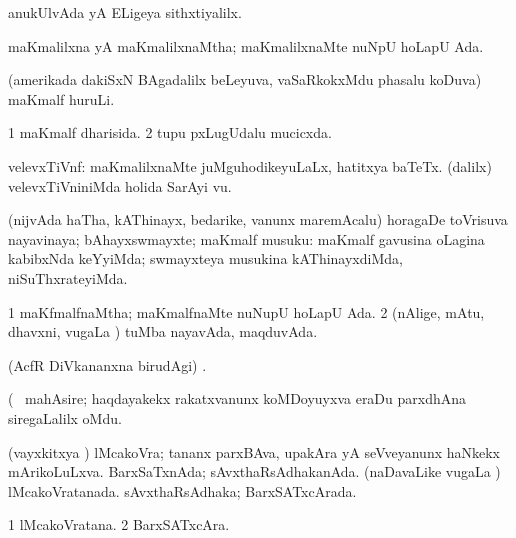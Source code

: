 \noindent 
\gl{\pagu}
\expl{}
\bmng
  anukUlvAda yA ELigeya sithxtiyalilx. 
\emng
\eentry

\bentry
{} 
\gl{\gu}
\expl{}
\bmng
 maKmalilxna yA maKmalilxnaMtha; maKmalilxnaMte nuNpU hoLapU Ada. 
\emng
\eentry

\bentry
{}
\gl{\nA}
\expl{}
\bmng
 (amerikada dakiSxN BAgadalilx beLeyuva, vaSaRkokxMdu phasalu koDuva) maKmalf huruLi. 
\emng
\eentry

\bentry
{} 
\gl{\gu}
\expl{}
\bmng
\bnum
\num{1} maKmalf dharisida. 
\num{2} tupu pxLugUdalu mucicxda. 
\enum
\emng
\eentry

\bentry
{} 
\gl{\nA}
\expl{}
\bmng
 velevxTiVnf: 
\banum
{} maKmalilxnaMte juMguhodikeyuLaLx, hatitxya baTeTx. 
 (\bava dalilx) velevxTiVniniMda holida SarAyi \mo vu. 
\eanum
\emng
\eentry

\bentry
{}
\gl{\nA}
\expl{}
\bmng
 (nijvAda haTha, kAThinayx, bedarike, \mo vanunx maremAcalu) horagaDe toVrisuva nayavinaya; bAhayxswmayxte; maKmalf musuku:  maKmalf gavusina oLagina kabibxNda keYyiMda; swmayxteya musukina kAThinayxdiMda, niSuThxrateyiMda. 
\emng
\eentry

\bentry
{} 
\gl{\gu}
\expl{}
\bmng
\bnum
\num{1} maKfmalfnaMtha; maKmalfnaMte nuNupU hoLapU Ada. 
\num{2} (nAlige, mAtu, dhavxni, \mo vugaLa \vi) tuMba nayavAda, maqduvAda. 
\enum
\emng
\eentry

\bentry
{}
\gl{\saMkiSx}
\expl{}
\bmng
 (AcfR DiVkananxna birudAgi) . 
\emng
\eentry

\bentry
{} 
\gl{\nA}(\bava\ 
\bmng
 mahAsire; haqdayakekx rakatxvanunx koMDoyuyxva eraDu parxdhAna siregaLalilx oMdu. 
\emng
\eentry

\bentry
{} 
\gl{\gu}
\expl{}
\bmng
\bnum
{} (vayxkitxya \vi) 
\banum
{} lMcakoVra; tananx parxBAva, upakAra yA seVveyanunx haNkekx mArikoLuLxva. 
 BarxSaTxnAda; sAvxthaRsAdhakanAda. 
\eanum
\numie
{} (naDavaLike \mo vugaLa \vi) 
\banum
{} lMcakoVratanada. 
 sAvxthaRsAdhaka; BarxSATxcArada. 
\eanum
\numie
\enum
\emng
\eentry

\bentry
{} 
\gl{\nA}
\expl{}
\bmng
\bnum
\num{1} lMcakoVratana. 
\num{2} BarxSATxcAra. 
\enum
\emng
\eentry


